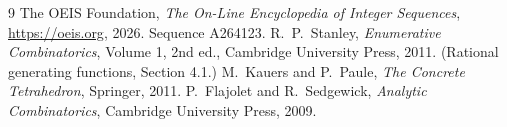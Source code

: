 \documentclass[11pt,a4paper]{article}
\theoremstyle{plain}
\theoremstyle{definition}
\begin{document}
\begin{thebibliography}{9}
 The OEIS Foundation, \emph{The On-Line Encyclopedia of Integer
Sequences}, \url{https://oeis.org}, 2026. Sequence A264123.
 R.~P.~Stanley, \emph{Enumerative Combinatorics}, Volume 1, 2nd ed.,
Cambridge University Press, 2011. (Rational generating functions, Section 4.1.)
 M.~Kauers and P.~Paule, \emph{The Concrete Tetrahedron}, Springer, 2011.
 P.~Flajolet and R.~Sedgewick, \emph{Analytic Combinatorics}, Cambridge
University Press, 2009.
\end{thebibliography}
\end{document}
